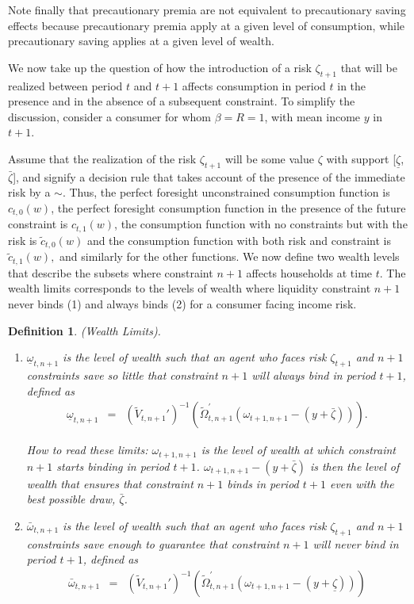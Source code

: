 \documentclass[titlepage]{\econtex}
\providecommand{\wAlt}{\omega}
\newtheorem{defn}{Definition}
\begin{document}
Note finally that precautionary premia are not equivalent to precautionary saving effects because precautionary premia apply at a given level of consumption, while precautionary saving applies at a given level of wealth.



We now take up the question of how the introduction of a risk
$\zeta_{t+1}$ that will be realized between period $t$ and $t+1$ affects consumption in period $t$ in the presence and in the absence of a subsequent constraint.  To simplify the discussion, consider a consumer for whom $\beta=R=1$, with mean income ${y}$ in $t+1$.

Assume that the realization of the risk $\zeta_{t+1}$ will be some value $\zeta$ with support [$\underline{\zeta}$,$\bar{\zeta}$], and signify a decision rule that takes account of the presence of the immediate risk by a $\sim$.  Thus, the perfect foresight unconstrained consumption function is $c_{t,0}(w)$, the perfect foresight consumption function in the presence of the future constraint is $c_{t,1}(w)$, the consumption function with no constraints but with the risk is $\tilde{c}_{t,0}(w)$ and the consumption function with both risk and constraint is $\tilde{c}_{t,1}(w),$ and similarly for the other functions. We now define two wealth levels that describe the subsets where constraint $n+1$ affects households at time $t$. The wealth limits corresponds to the levels of wealth where liquidity constraint $n+1$ never binds (1) and always binds (2) for a consumer facing income risk.

\begin{defn}(Wealth Limits).
	\begin{enumerate}
		\item ${\underline{\wAlt}}_{t,n+1}$ is the level of wealth such that an agent who faces risk $\zeta_{t+1}$ and $n+1$ constraints save so little that constraint $n+1$ will always bind in period $t+1$, defined as
	\begin{eqnarray}
	{\underline{\wAlt}}_{t,n+1} & = & \left(\tilde{V}_{t,n+1}'\right)^{-1}(\tilde{\Omega}_{t,n+1}^{\prime}(\wAlt_{t+1,n+1}-({y}+\bar{\zeta}))).
	\end{eqnarray}

	How to read these limits: $\wAlt_{t+1,n+1}$ is the level of wealth at which constraint $n+1$ starts binding in period $t+1$. $\wAlt_{t+1,n+1} - ({y} + \bar{\zeta})$ is then the level of wealth that ensures that constraint $n+1$ binds in period $t+1$ even with the best possible draw, $\bar{\zeta}$.


	\item ${\bar{\wAlt}}_{t,n+1}$ is the level of wealth such that an agent who faces risk $\zeta_{t+1}$ and $n+1$ constraints save enough to guarantee that constraint $n+1$ will never bind in period $t+1$, defined as
	\begin{eqnarray}
	{\bar{\wAlt}}_{t,n+1} & = & \left(\tilde{V}_{t,n+1}'\right)^{-1}(\tilde{\Omega}_{t,n+1}^{\prime}(\wAlt_{t+1,n+1}-({y}+\underline{\zeta}))) \label{eq:tildeomegabar}
	\end{eqnarray}

	\end{enumerate}
      \end{defn}
\end{document}
